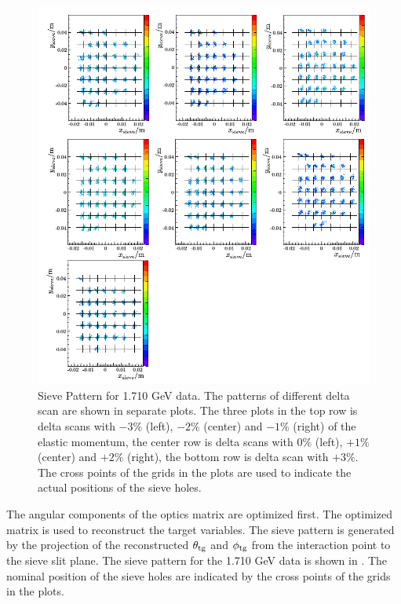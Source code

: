 \begin{figure}[p!]
  \centering
  \includegraphics[width=\textwidth]{figs/sieve-pattern.png}
  \caption[Sieve Pattern for 1.710 GeV data.]{Sieve Pattern for 1.710 GeV data. The patterns of different delta scan are shown in separate plots. The three plots in the top row is delta scans with $-3\%$ (left), $-2\%$ (center) and $-1\%$ (right) of the elastic momentum, the center row is delta scans with $0\%$ (left), $+1\%$ (center) and $+2\%$ (right), the bottom row is delta scan with $+3\%$. The cross points of the grids in the plots are used to indicate the actual positions of the sieve holes. \label{C6S3F3}}
\end{figure}

The angular components of the optics matrix are optimized first. The optimized matrix is used to reconstruct the target variables. The sieve pattern is generated by the projection of the reconstructed $\theta_{\mathrm{tg}}$ and $\phi_{\mathrm{tg}}$ from the interaction point to the sieve slit plane. The sieve pattern for the 1.710 GeV data is shown in . The nominal position of the sieve holes are indicated by the cross points of the grids in the plots.

